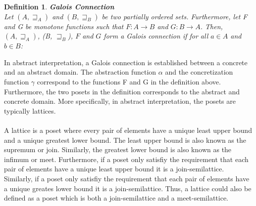 \documentclass{kththesis}
\newtheorem{definition}{Definition}
\begin{document}
\begin{definition} \textbf{Galois Connection}\\
Let $(A, \sqsupseteq_A)$ and $(B, \sqsupseteq_B)$ be two partially ordered sets. Furthermore, let F and G be monotone functions such that  $F : A \rightarrow B$ and $G : B \rightarrow A$. Then, ${(A, \sqsupseteq_A)}$, (B, $\sqsupseteq_B$), $F$ and $G$ form a Galois connection  if for all $a \in A$ and $b \in B$:
\end{definition}
\noindent
In abstract interpretation, a Galois connection is established between a concrete and an abstract domain. The abstraction function $\alpha$ and the concretization function $\gamma$ correspond to the functions F and G in the definition above. Furthermore, the two posets in the definition corresponds to the abstract and concrete domain. More specifically, in abstract interpretation, the posets are typically lattices.
\\ \\%
A lattice is a poset where every pair of elements have a unique least upper bound and a unique greatest lower bound. The least upper bound is also known as the supremum or join. Similarly, the greatest lower bound is also known as the infimum or meet. Furthermore, if a poset only satisfiy the requirement that each pair of elements have a unique least upper bound it is a join-semilattice. Similarly, if a poset only satisfiy the requirement that each pair of elements have a unique greates lower bound it is a join-semilattice. Thus, a lattice could also be defined as a poset which is both a join-semilattice and a meet-semilattice.





\end{document}
